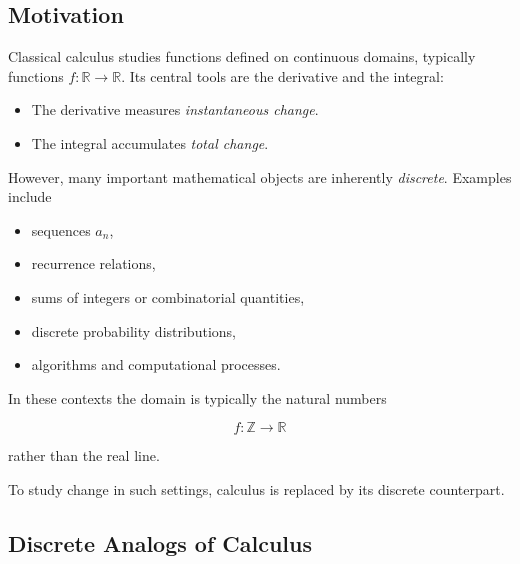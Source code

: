 
\subsection*{Motivation}

\begin{exposition}
Classical calculus studies functions defined on continuous domains, typically
functions \(f : \mathbb{R} \to \mathbb{R}\).
Its central tools are the derivative and the integral:

\begin{itemize}
\item The derivative measures \emph{instantaneous change}.
\item The integral accumulates \emph{total change}.
\end{itemize}

However, many important mathematical objects are inherently \emph{discrete}.
Examples include

\begin{itemize}
\item sequences \(a_n\),
\item recurrence relations,
\item sums of integers or combinatorial quantities,
\item discrete probability distributions,
\item algorithms and computational processes.
\end{itemize}

In these contexts the domain is typically the natural numbers

\[
f : \mathbb{Z} \to \mathbb{R}
\]

rather than the real line.

To study change in such settings, calculus is replaced by its discrete
counterpart.
\end{exposition}

\subsection*{Discrete Analogs of Calculus}

